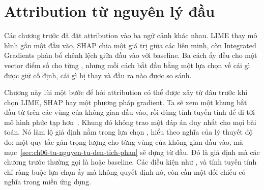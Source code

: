 \chapter{Attribution từ nguyên lý đầu}
\label{ch:attribution-tu-nguyen-ly-dau}

Các chương trước đã đặt attribution vào ba ngữ cảnh khác nhau. LIME thay mô
hình gần một đầu vào, SHAP chia một giá trị giữa các liên minh, còn Integrated
Gradients phân bổ chênh lệch giữa đầu vào với baseline. Ba cách ấy đều cho một
vector điểm số cho từng , nhưng mỗi cách bắt đầu bằng một
lựa chọn về cái gì được giữ cố định, cái gì bị thay và đầu ra nào được so sánh.

Chương này lùi một bước để hỏi attribution có thể được xây từ đâu trước khi
chọn LIME, SHAP hay một phương pháp gradient. Ta sẽ xem một khung bắt đầu từ
 trên các vùng của không gian đầu vào, rồi
dùng tính tuyến tính để đi tới mô hình phức tạp hơn~\autocite{p17firstprinciples}.
Khung đó không trao một đáp án duy nhất cho mọi bài toán. Nó làm lộ giả định nằm
trong lựa chọn , hiểu theo nghĩa của lý thuyết độ đo: một quy
tắc gán trọng lượng cho từng vùng của không gian đầu vào, mà
mục~\ref{sec:ch06-tu-nguyen-tu-den-tich-phan} sẽ dựng từ đầu. Đó là giả định
mà các chương trước thường gọi là 
hoặc baseline. Các điều kiện như
,  và tính tuyến tính
chỉ ràng buộc lựa chọn ấy mà không quyết định nó, còn
 cần một đối chiếu có nghĩa trong miền ứng
dụng.









